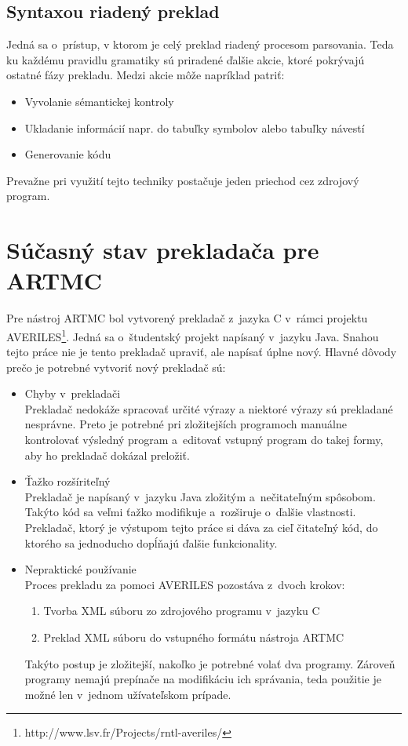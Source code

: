 \section{Syntaxou riadený preklad}
\label{sec_synta}
Jedná sa o~prístup, v ktorom je celý preklad riadený procesom parsovania. Teda ku každému pravidlu gramatiky sú priradené ďalšie akcie, ktoré pokrývajú ostatné fázy prekladu. Medzi akcie môže napríklad patriť:
\begin{itemize}
    \item Vyvolanie sémantickej kontroly
    \item Ukladanie informácií napr. do tabuľky symbolov alebo tabuľky návestí
    \item Generovanie kódu
\end{itemize}
Prevažne pri využití tejto techniky postačuje jeden priechod cez zdrojový program\cite{aho}.


\chapter{Súčasný stav prekladača pre ARTMC}
\label{kap_averiles}
Pre nástroj ARTMC bol vytvorený prekladač z~jazyka C v~rámci projektu AVERILES\footnote{http://www.lsv.fr/Projects/rntl-averiles/}. Jedná sa
o~študentský projekt napísaný v~jazyku Java. Snahou tejto práce nie je tento prekladač
upraviť, ale napísať úplne nový. Hlavné dôvody prečo je potrebné vytvoriť nový
prekladač sú:
\begin{itemize}
    \item Chyby v~prekladači\\
        Prekladač nedokáže spracovať určité výrazy a niektoré výrazy sú prekladané nesprávne.
        Preto je potrebné pri zložitejších programoch manuálne kontrolovať výsledný
        program a~editovať vstupný program do takej formy, aby ho prekladač dokázal
        preložiť.
    \item Ťažko rozšíriteľný\\
        Prekladač je napísaný v~jazyku Java zložitým a~nečitateľným spôsobom. Takýto
        kód sa veľmi ťažko modifikuje a~rozširuje o~ďalšie vlastnosti. Prekladač,
        ktorý je výstupom tejto práce si dáva za cieľ čitateľný kód, do ktorého
        sa jednoducho dopĺňajú ďalšie funkcionality.
    \item Nepraktické používanie\\
        Proces prekladu za pomoci AVERILES pozostáva z~dvoch krokov:
        \begin{enumerate}
            \item Tvorba XML súboru zo zdrojového programu v~jazyku C
            \item Preklad XML súboru do vstupného formátu nástroja ARTMC
        \end{enumerate}
        Takýto postup je zložitejší, nakoľko je potrebné volať dva programy.
        Zároveň programy nemajú prepínače na modifikáciu ich správania, teda
        použitie je možné len v~jednom užívateľskom prípade.
\end{itemize}

